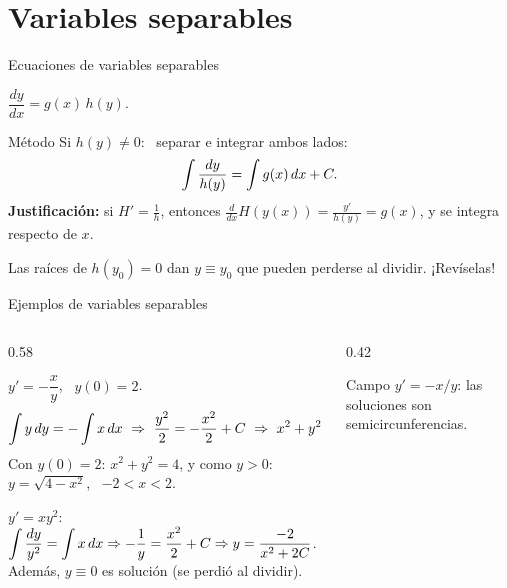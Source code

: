 \documentclass[10pt,aspectratio=169]{beamer}
\begin{document}
\section{Variables separables}

\begin{frame}{Ecuaciones de variables separables}
  \begin{definicion}
    $\dfrac{dy}{dx}=g(x)\,h(y)$.
  \end{definicion}
  \begin{block}{Método}
    Si $h(y)\ne0$: \ separar e integrar ambos lados:
    \[ \int\frac{dy}{h(y)}=\int g(x)\,dx+C. \]
    \textbf{Justificación:} si $H'=\frac1h$, entonces $\frac{d}{dx}H(y(x))=\frac{y'}{h(y)}=g(x)$, y se integra respecto de $x$.
  \end{block}
  \begin{observacion}
    Las raíces de $h(y_0)=0$ dan  $y\equiv y_0$ que pueden perderse al dividir. ¡Revíselas!
  \end{observacion}
\end{frame}

\begin{frame}{Ejemplos de variables separables}
  \begin{columns}
    \begin{column}{0.58\textwidth}
      \begin{ejemplo}[1]
        $y'=-\dfrac xy$, \ $y(0)=2$.
        \[ \int y\dy=-\int x\dx\ \Rightarrow\ \frac{y^2}2=-\frac{x^2}2+C\ \Rightarrow\ x^2+y^2=2C. \]
        Con $y(0)=2$: $x^2+y^2=4$, y como $y>0$: \ $y=\sqrt{4-x^2}$, \ $-2<x<2$.
      \end{ejemplo}
      \begin{ejemplo}[2]
        $y'=xy^2$: \ $\displaystyle\int\frac{dy}{y^2}=\int x\,dx\Rightarrow-\frac1y=\frac{x^2}2+C\Rightarrow y=\frac{-2}{x^2+2C}$.
        Además, $y\equiv0$ es solución (se perdió al dividir).
      \end{ejemplo}
    \end{column}
    \begin{column}{0.42\textwidth}
      \centering

      \small Campo $y'=-x/y$: las soluciones son semicircunferencias.
    \end{column}
  \end{columns}
\end{frame}
\end{document}

